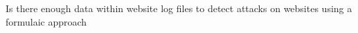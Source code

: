 
Is there enough data within website log files to detect attacks  on websites using a formulaic approach